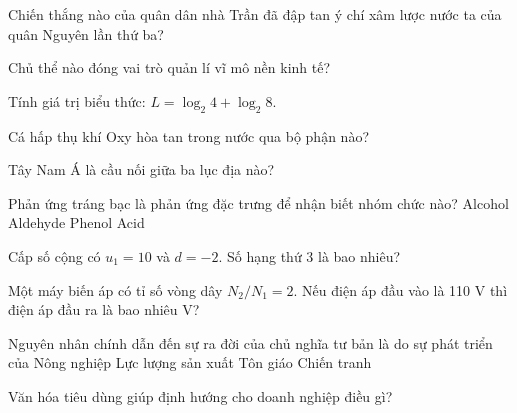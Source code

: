 \begin{ex}
    Chiến thắng nào của quân dân nhà Trần đã đập tan ý chí xâm lược nước ta của quân Nguyên lần thứ ba?
\end{ex}
\begin{ex}
    Chủ thể nào đóng vai trò quản lí vĩ mô nền kinh tế?
\end{ex}
\begin{ex}
    Tính giá trị biểu thức: $L = \log_2 4 + \log_2 8$.
\end{ex}
\begin{ex}
    Cá hấp thụ khí Oxy hòa tan trong nước qua bộ phận nào?
\end{ex}
\begin{ex}
    Tây Nam Á là cầu nối giữa ba lục địa nào?
\end{ex}
\begin{ex}
    Phản ứng tráng bạc là phản ứng đặc trưng để nhận biết nhóm chức nào?
    \choice
    {Alcohol}
    {\True Aldehyde}
    {Phenol}
    {Acid}
\end{ex}
\begin{ex}
    Cấp số cộng có $u_1 = 10$ và $d = -2$. Số hạng thứ 3 là bao nhiêu?
\end{ex}
\begin{ex}
    Một máy biến áp có tỉ số vòng dây $N_2/N_1 = 2$. Nếu điện áp đầu vào là 110 V thì điện áp đầu ra là bao nhiêu V?
\end{ex}
\begin{ex}
    Nguyên nhân chính dẫn đến sự ra đời của chủ nghĩa tư bản là do sự phát triển của
    \choice
    {Nông nghiệp}
    {\True Lực lượng sản xuất}
    {Tôn giáo}
    {Chiến tranh}
\end{ex}
\begin{ex}
    Văn hóa tiêu dùng giúp định hướng cho doanh nghiệp điều gì?
\end{ex}
